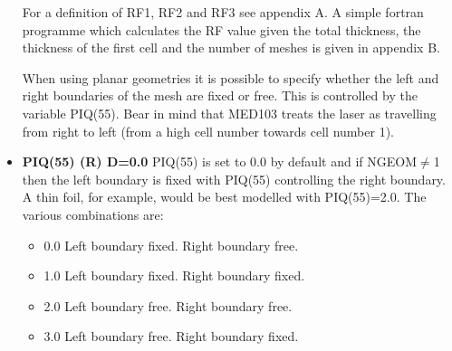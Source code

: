 \begin{itemize}
For a definition of RF1, RF2 and RF3 see appendix A.
A simple fortran programme which calculates the RF value given the total thickness,
the thickness of the first cell and the number of meshes is given in appendix B.
 
When using planar geometries it is possible to specify whether the left
and right boundaries of the mesh are fixed or free. This is controlled by
the variable PIQ(55). Bear in mind that MED103 treats the laser as
travelling from right to left (from a high cell number towards cell
number 1). 
\item {\bf PIQ(55) (R) D=0.0}
PIQ(55) is set to 0.0 by default and if NGEOM$\not=$1 then the
left boundary is fixed with PIQ(55) controlling the right boundary.
A thin foil, for example, would be best modelled with PIQ(55)=2.0.
The various combinations are:
\begin{itemize}
\begin{itemize}
\item{0.0} Left boundary fixed. Right boundary free.
\item{1.0} Left boundary fixed. Right boundary fixed.
\item{2.0} Left boundary free. Right boundary free.
\item{3.0} Left boundary free. Right boundary fixed.
\end{itemize}
\end{itemize}
\end{itemize}
 

